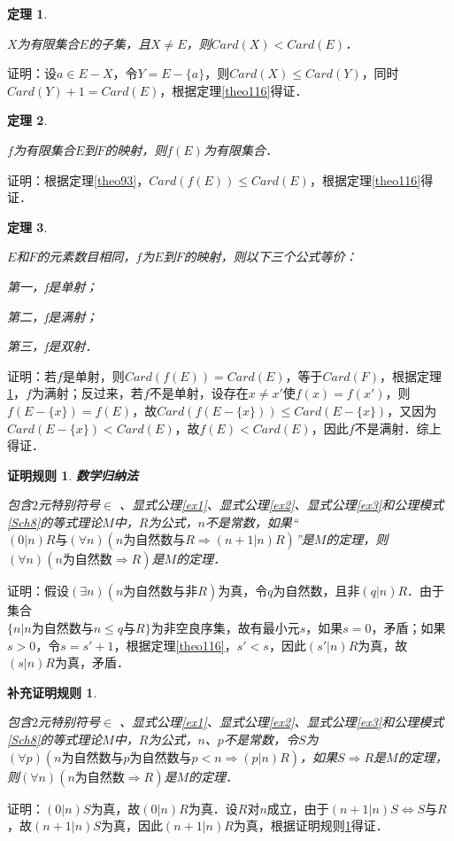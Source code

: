 \documentclass[12pt, a4paper, oneside]{book}
\newtheorem{C}{证明规则}
\newtheorem{Ccor}{补充证明规则}
\newtheorem{theo}{定理}
\begin{document}
			\begin{theo}\label{theo118}
				\hfill\par
				$X$为有限集合$E$的子集，且$X\neq E$，则$Card(X)<Card(E)$．
			\end{theo}
			证明：设$a\in E-X$，令$Y=E-\{a\}$，则$Card(X)\leq Card(Y)$，同时$Card(Y)+1=Card(E)$，根据定理\ref{theo116}得证．
									
			\begin{theo}\label{theo119}
				\hfill\par
				$f$为有限集合$E$到$F$的映射，则$f(E)$为有限集合．
			\end{theo}
			证明：根据定理\ref{theo93}，$Card(f(E))\leq Card(E)$，根据定理\ref{theo116}得证．
									
			\begin{theo}\label{theo120}
				\hfill\par
				$E$和$F$的元素数目相同，$f$为$E$到$F$的映射，则以下三个公式等价：
				\par
				第一，f是单射；
				\par
				第二，f是满射；
				\par
				第三，f是双射．
			\end{theo}
			证明：若$f$是单射，则$Card(f(E))=Card(E)$，等于$Card(F)$，根据定理\ref{theo118}，$f$为满射；反过来，若$f$不是单射，设存在$x\neq x'$使$f(x)=f(x')$，则$f(E-\{x\})=f(E)$，故$Card(f(E-\{x\}))\leq Card(E-\{x\})$，又因为$Card(E-\{x\})<Card(E)$，故$f(E)<Card(E)$，因此$f$不是满射．综上得证．
			
			\begin{C}\label{C61}
				\textbf{数学归纳法}
				\par
				包含$2$元特别符号$\in$ 、显式公理\ref{ex1}、显式公理\ref{ex2}、显式公理\ref{ex3}和公理模式\ref{Sch8}的等式理论$M$中，$R$为公式，$n$不是常数，如果“$(0|n)R\text{与}(\forall n)(n\text{为自然数}\text{与}R\Rightarrow (n+1|n)R)$”是$M$的定理，则$(\forall n)(n\text{为自然数}\Rightarrow R)$是$M$的定理．
			\end{C}
			证明：假设$(\exists n)(n\text{为自然数}\text{与}\text{非}R)$为真，令$q$为自然数，且$\text{非}(q|n)R$．由于集合\\$\{n|n\text{为自然数}\text{与}n\leq q\text{与}R\}$为非空良序集，故有最小元$s$，如果$s=0$，矛盾；如果$s>0$，令$s=s'+1$，根据定理\ref{theo116}，$s'<s$，因此$(s'|n)R$为真，故$(s|n)R$为真，矛盾．
			
			\begin{Ccor}\label{Ccor87}
				\hfill\par
				包含$2$元特别符号$\in$ 、显式公理\ref{ex1}、显式公理\ref{ex2}、显式公理\ref{ex3}和公理模式\ref{Sch8}的等式理论$M$中，$R$为公式，$n$、$p$不是常数，令$S$为$(\forall p)(n\text{为自然数}\text{与}p\text{为自然数}\text{与}p<n\Rightarrow (p|n)R)$，如果$S\Rightarrow R$是$M$的定理，则$(\forall n)(n\text{为自然数}\Rightarrow R)$是$M$的定理．
			\end{Ccor}
			证明：$(0|n)S$为真，故$(0|n)R$为真．设$R$对$n$成立，由于$(n+1|n)S\Leftrightarrow S\text{与}R$，故$(n+1|n)S$为真，因此$(n+1|n)R$为真，根据证明规则\ref{C61}得证．
						
\end{document}
